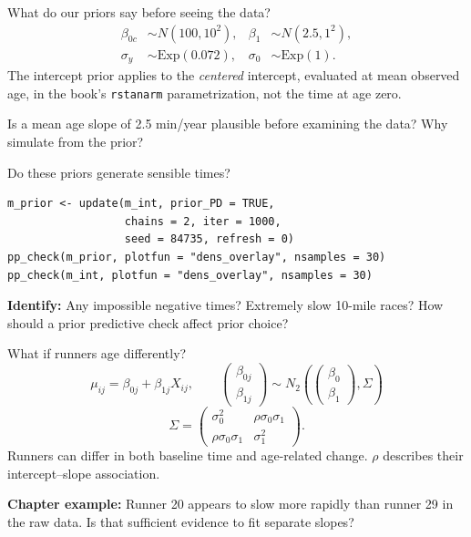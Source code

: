 \documentclass[aspectratio=43,11pt]{beamer}
\begin{document}
\begin{frame}{What do our priors say before seeing the data?}
\begin{align*}
\beta_{0c} &\sim N(100,10^2), & \beta_1&\sim N(2.5,1^2),\\
\sigma_y &\sim\mathrm{Exp}(0.072), & \sigma_0&\sim\mathrm{Exp}(1).
\end{align*}
The intercept prior applies to the \emph{centered} intercept, evaluated at mean observed age, in the book's \texttt{rstanarm} parametrization, not the time at age zero.\par
\par \vspace{4mm}
Is a mean age slope of 2.5 min/year plausible before examining the data? Why simulate from the prior?
\end{frame}

\begin{frame}[fragile]{Do these priors generate sensible times?}
\begin{lstlisting}
m_prior <- update(m_int, prior_PD = TRUE,
                  chains = 2, iter = 1000,
                  seed = 84735, refresh = 0)
pp_check(m_prior, plotfun = "dens_overlay", nsamples = 30)
pp_check(m_int, plotfun = "dens_overlay", nsamples = 30)
\end{lstlisting}
\textbf{Identify:} Any impossible negative times? Extremely slow 10-mile races? How should a prior predictive check affect prior choice?\par
\end{frame}

\begin{frame}{What if runners age differently?}
\[\mu_{ij}=\beta_{0j}+\beta_{1j}X_{ij},\qquad
\begin{pmatrix}\beta_{0j}\\\beta_{1j}\end{pmatrix}\sim N_2\!\left(\begin{pmatrix}\beta_0\\\beta_1\end{pmatrix},\Sigma\right)\]
\[\Sigma=\begin{pmatrix}\sigma_0^2&\rho\sigma_0\sigma_1\\\rho\sigma_0\sigma_1&\sigma_1^2\end{pmatrix}.\]
Runners can differ in both baseline time and age-related change. $\rho$ describes their intercept--slope association.\par
\textbf{Chapter example:} Runner 20 appears to slow more rapidly than runner 29 in the raw data. Is that sufficient evidence to fit separate slopes?
\end{frame}
\end{document}
